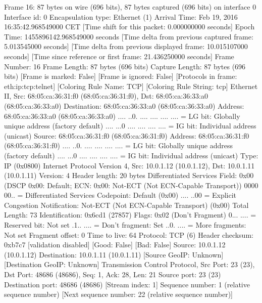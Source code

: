 Frame 16: 87 bytes on wire (696 bits), 87 bytes captured (696 bits) on interface 0
    Interface id: 0
    Encapsulation type: Ethernet (1)
    Arrival Time: Feb 19, 2016 16:35:42.968549000 CET
    [Time shift for this packet: 0.000000000 seconds]
    Epoch Time: 1455896142.968549000 seconds
    [Time delta from previous captured frame: 5.013545000 seconds]
    [Time delta from previous displayed frame: 10.015107000 seconds]
    [Time since reference or first frame: 21.436250000 seconds]
    Frame Number: 16
    Frame Length: 87 bytes (696 bits)
    Capture Length: 87 bytes (696 bits)
    [Frame is marked: False]
    [Frame is ignored: False]
    [Protocols in frame: eth:ip:tcp:telnet]
    [Coloring Rule Name: TCP]
    [Coloring Rule String: tcp]
Ethernet II, Src: 68:05:ca:36:31:f0 (68:05:ca:36:31:f0), Dst: 68:05:ca:36:33:a0 (68:05:ca:36:33:a0)
    Destination: 68:05:ca:36:33:a0 (68:05:ca:36:33:a0)
        Address: 68:05:ca:36:33:a0 (68:05:ca:36:33:a0)
        .... ..0. .... .... .... .... = LG bit: Globally unique address (factory default)
        .... ...0 .... .... .... .... = IG bit: Individual address (unicast)
    Source: 68:05:ca:36:31:f0 (68:05:ca:36:31:f0)
        Address: 68:05:ca:36:31:f0 (68:05:ca:36:31:f0)
        .... ..0. .... .... .... .... = LG bit: Globally unique address (factory default)
        .... ...0 .... .... .... .... = IG bit: Individual address (unicast)
    Type: IP (0x0800)
Internet Protocol Version 4, Src: 10.0.1.12 (10.0.1.12), Dst: 10.0.1.11 (10.0.1.11)
    Version: 4
    Header length: 20 bytes
    Differentiated Services Field: 0x00 (DSCP 0x00: Default; ECN: 0x00: Not-ECT (Not ECN-Capable Transport))
        0000 00.. = Differentiated Services Codepoint: Default (0x00)
        .... ..00 = Explicit Congestion Notification: Not-ECT (Not ECN-Capable Transport) (0x00)
    Total Length: 73
    Identification: 0x6cd1 (27857)
    Flags: 0x02 (Don't Fragment)
        0... .... = Reserved bit: Not set
        .1.. .... = Don't fragment: Set
        ..0. .... = More fragments: Not set
    Fragment offset: 0
    Time to live: 64
    Protocol: TCP (6)
    Header checksum: 0xb7c7 [validation disabled]
        [Good: False]
        [Bad: False]
    Source: 10.0.1.12 (10.0.1.12)
    Destination: 10.0.1.11 (10.0.1.11)
    [Source GeoIP: Unknown]
    [Destination GeoIP: Unknown]
Transmission Control Protocol, Src Port: 23 (23), Dst Port: 48686 (48686), Seq: 1, Ack: 28, Len: 21
    Source port: 23 (23)
    Destination port: 48686 (48686)
    [Stream index: 1]
    Sequence number: 1    (relative sequence number)
    [Next sequence number: 22    (relative sequence number)]
